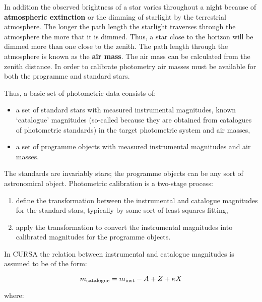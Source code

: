 \documentclass[twoside,11pt]{starlink}
\begin{document}
In addition the observed brightness of a star varies throughout a
night  because of \textbf{atmospheric extinction} or the dimming of
starlight by the terrestrial atmosphere.  The longer the path length
the starlight traverses through the atmosphere the more that it is dimmed.
Thus, a star close to the horizon will be dimmed more than one close
to the zenith.  The path length through the atmosphere is known as the
\textbf{air mass}.  The air mass can be calculated from the zenith
distance.  In order to calibrate photometry air masses must be available
for both the programme and standard stars.

Thus, a basic set of photometric data consists of:

\begin{itemize}

  \item a set of standard stars with measured instrumental magnitudes,
   known `catalogue' magnitudes (so-called because they are obtained
   from catalogues of photometric standards) in the target photometric
   system and air masses,

  \item a set of programme objects with measured instrumental magnitudes
   and air masses.

\end{itemize}

The standards are invariably stars; the programme objects can be any
sort of astronomical object.  Photometric calibration is a two-stage
process:

\begin{enumerate}

  \item define the transformation between the instrumental and catalogue
   magnitudes for the standard stars, typically by some sort of least
   squares fitting,

  \item apply the transformation to convert the instrumental magnitudes
   into calibrated magnitudes for the programme objects.

\end{enumerate}

In CURSA the relation between instrumental and catalogue magnitudes
is assumed to be of the form:

\begin{equation}
m_{\rm catalogue} = m_{\rm inst} - A + Z + \kappa X
\end{equation}

where:
\end{document}
